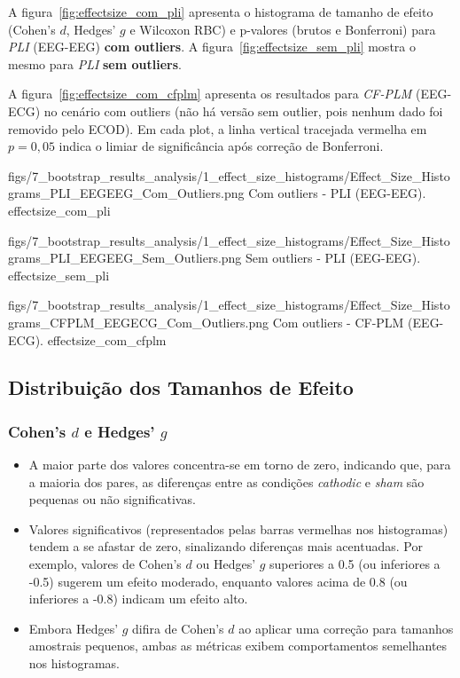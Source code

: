 A figura~\ref{fig:effectsize_com_pli} apresenta o histograma de tamanho de efeito (Cohen's \(d\), Hedges' \(g\) e Wilcoxon RBC) e p-valores (brutos e Bonferroni) para \emph{PLI} (EEG-EEG) \textbf{com outliers}. A figura~\ref{fig:effectsize_sem_pli} mostra o mesmo para \emph{PLI} \textbf{sem outliers}.
  
A figura~\ref{fig:effectsize_com_cfplm} apresenta os resultados para \emph{CF-PLM} (EEG-ECG) no cenário com outliers (não há versão sem outlier, pois nenhum dado foi removido pelo ECOD). Em cada plot, a linha vertical tracejada vermelha em \(p=0{,}05\) indica o limiar de significância após correção de Bonferroni.


\ultrawidefigure
  {figs/7_bootstrap_results_analysis/1_effect_size_histograms/Effect_Size_Histograms_PLI_EEGEEG_Com_Outliers.png}
  {Com outliers - PLI (EEG-EEG).}
  {effectsize_com_pli}

\ultrawidefigure
  {figs/7_bootstrap_results_analysis/1_effect_size_histograms/Effect_Size_Histograms_PLI_EEGEEG_Sem_Outliers.png}
  {Sem outliers - PLI (EEG-EEG).}
  {effectsize_sem_pli}

\ultrawidefigure
  {figs/7_bootstrap_results_analysis/1_effect_size_histograms/Effect_Size_Histograms_CFPLM_EEGECG_Com_Outliers.png}
  {Com outliers - CF-PLM (EEG-ECG).}
  {effectsize_com_cfplm}

\subsection{Distribuição dos Tamanhos de Efeito}
\subsubsection{Cohen's \(d\) e Hedges' \(g\) }
\begin{itemize}
    \item A maior parte dos valores concentra-se em torno de zero, indicando que, para a maioria dos pares, as diferenças entre as condições \textit{cathodic} e \textit{sham} são pequenas ou não significativas.
    \item Valores significativos (representados pelas barras vermelhas nos histogramas) tendem a se afastar de zero, sinalizando diferenças mais acentuadas. Por exemplo, valores de Cohen's \(d\) ou Hedges' \(g\)  superiores a 0.5 (ou inferiores a -0.5) sugerem um efeito moderado, enquanto valores acima de 0.8 (ou inferiores a -0.8) indicam um efeito alto.
    \item Embora Hedges' \(g\)  difira de Cohen's \(d\) ao aplicar uma correção para tamanhos amostrais pequenos, ambas as métricas exibem comportamentos semelhantes nos histogramas.
\end{itemize}


